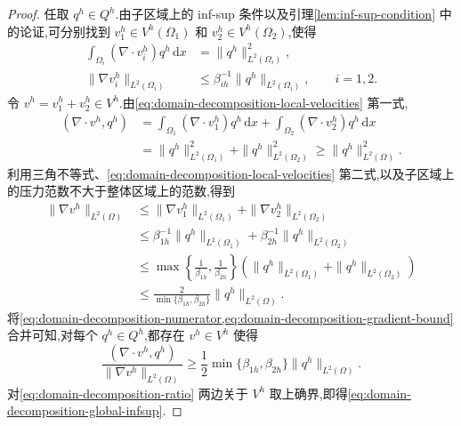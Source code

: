 \begin{proof}
任取 $q^h\in Q^h$.由子区域上的 inf-sup 条件以及引理\ref{lem:inf-sup-condition} 中的论证,可分别找到 $v_1^h\in V^h(\Omega_1)$ 和 $v_2^h\in V^h(\Omega_2)$,使得
\begin{equation}\label{eq:domain-decomposition-local-velocities}
\begin{aligned}
  \int_{\Omega_i}(\nabla\cdot v_i^h)q^h\,\mathrm{d}x
  &=\|q^h\|_{L^2(\Omega_i)}^2,\\
  \|\nabla v_i^h\|_{L^2(\Omega_i)}
  &\le \beta_{ih}^{-1}\|q^h\|_{L^2(\Omega_i)},
  \qquad i=1,2.
\end{aligned}
\end{equation}
令 $v^h=v_1^h+v_2^h\in V^h$.由\cref{eq:domain-decomposition-local-velocities} 第一式,
\begin{equation}\label{eq:domain-decomposition-numerator}
\begin{aligned}
  (\nabla\cdot v^h,q^h)
  &=\int_{\Omega_1}(\nabla\cdot v_1^h)q^h\,\mathrm{d}x
    +\int_{\Omega_2}(\nabla\cdot v_2^h)q^h\,\mathrm{d}x\\
  &=\|q^h\|_{L^2(\Omega_1)}^2+\|q^h\|_{L^2(\Omega_2)}^2
    \ge \|q^h\|_{L^2(\Omega)}^2.
\end{aligned}
\end{equation}
利用三角不等式、\cref{eq:domain-decomposition-local-velocities} 第二式,以及子区域上的压力范数不大于整体区域上的范数,得到
\begin{equation}\label{eq:domain-decomposition-gradient-bound}
\begin{aligned}
  \|\nabla v^h\|_{L^2(\Omega)}
  &\le \|\nabla v_1^h\|_{L^2(\Omega_1)}
       +\|\nabla v_2^h\|_{L^2(\Omega_2)}\\
  &\le \beta_{1h}^{-1}\|q^h\|_{L^2(\Omega_1)}
       +\beta_{2h}^{-1}\|q^h\|_{L^2(\Omega_2)}\\
  &\le \max\left\{\frac{1}{\beta_{1h}},\frac{1}{\beta_{2h}}\right\}
       \left(\|q^h\|_{L^2(\Omega_1)}+\|q^h\|_{L^2(\Omega_2)}\right)\\
  &\le \frac{2}{\min\{\beta_{1h},\beta_{2h}\}}
       \|q^h\|_{L^2(\Omega)}.
\end{aligned}
\end{equation}
将\cref{eq:domain-decomposition-numerator,eq:domain-decomposition-gradient-bound} 合并可知,对每个 $q^h\in Q^h$,都存在 $v^h\in V^h$ 使得
\begin{equation}\label{eq:domain-decomposition-ratio}
  \frac{(\nabla\cdot v^h,q^h)}{\|\nabla v^h\|_{L^2(\Omega)}}
  \ge \frac{1}{2}\min\{\beta_{1h},\beta_{2h}\}
       \|q^h\|_{L^2(\Omega)}.
\end{equation}
对\cref{eq:domain-decomposition-ratio} 两边关于 $V^h$ 取上确界,即得\cref{eq:domain-decomposition-global-infsup}.


\end{proof}
